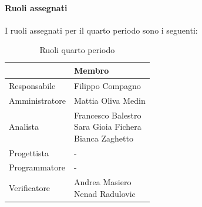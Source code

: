\documentclass[a4paper,12pt]{article}
\begin{document}
            \paragraph{Ruoli assegnati}
            I ruoli assegnati per il quarto periodo sono i seguenti:
                \begin{table}[H]
                \centering
                \begin{tabular}{|l|l|}
                \hline
                    \rowcolor{lightgray}{\textbf{Ruolo}} & {\textbf{Membro}} \\
                \hline
                    Responsabile & Filippo Compagno \\
                \hline
                    Amministratore & Mattia Oliva Medin \\
                \hline
                    Analista & \makecell[l]{Francesco Balestro \\ Sara Gioia Fichera \\ Bianca Zaghetto} \\
                \hline
                    Progettista & - \\
                \hline
                    Programmatore & - \\
                \hline
                    Verificatore & \makecell[l]{Andrea Masiero \\ Nenad Radulovic} \\
                \hline
                \end{tabular}
                \caption{Ruoli quarto periodo}
                \end{table}
                
\end{document}
